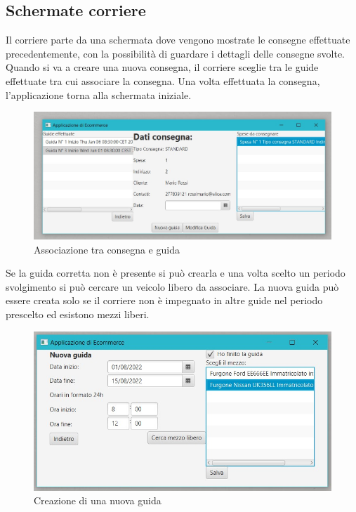 \documentclass[a4paper,12pt]{report}
\begin{document}
\subsection*{Schermate corriere}
Il corriere parte da una schermata dove vengono mostrate le consegne effettuate precedentemente, con la possibilità di guardare i dettagli delle consegne svolte.
Quando si va a creare una nuova consegna, il corriere sceglie tra le guide effettuate tra cui associare la consegna. 
Una volta effettuata la consegna, l'applicazione torna alla schermata iniziale.
\begin{figure}[H]
	\centering{}
	\includegraphics[width=\textwidth]{img/Application/Courier1.jpg}
	\caption{Associazione tra consegna e guida}
\end{figure}
Se la guida corretta non è presente si può crearla e una volta scelto un periodo svolgimento si può cercare un veicolo libero da associare. 
La nuova guida può essere creata solo se il corriere non è impegnato in altre guide nel periodo prescelto ed esistono mezzi liberi.
\begin{figure}[H]
	\centering{}
	\includegraphics[width=\textwidth]{img/Application/Courier2.jpg}
	\caption{Creazione di una nuova guida}
\end{figure}
\end{document}
